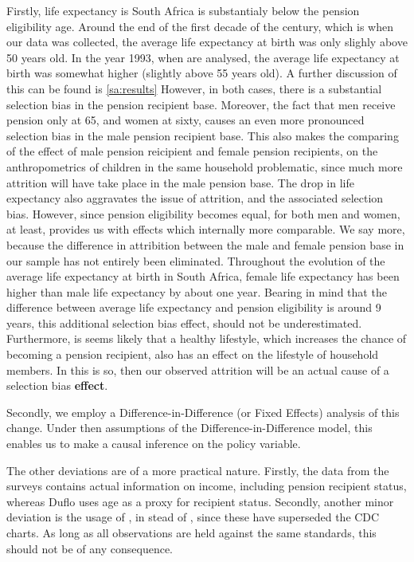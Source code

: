 \begin{refsection}
Firstly, life expectancy is South Africa is substantialy below the pension eligibility age.
Around the end of the first decade of the century, which is when our data was collected,
the average life expectancy at birth was only slighly above 50 years old.
In the year 1993, when \textcite{duflo2000child,duflo2003grandmothers} are analysed,
the average life expectancy at birth was somewhat higher (slightly above 55 years old).
A further discussion of this can be found is \autoref{sa:results}
However, in both cases, there is a substantial selection bias in the pension recipient base.
Moreover, the fact that men receive pension only at 65, and women at sixty,
causes an even more pronounced selection bias in the male pension recipient base.
This also makes the comparing of the effect of male pension reicipient and female pension recipients,
on the anthropometrics of children in the same household problematic,
since much more attrition will have take place in the male pension base.
The drop in life expectancy also aggravates the issue of attrition,
and the associated selection bias.
However, since pension eligibility becomes equal, for both men and women, at least,
provides us with effects which internally more comparable.
We say more, because the difference in attribition between the male and female pension base in our sample has not entirely been eliminated.
Throughout the evolution of the average life expectancy at birth in South Africa,
female life expectancy has been higher than male life expectancy by about one year.
Bearing in mind that the difference between average life expectancy and pension eligibility is around 9 years,
this additional selection bias effect, should not be underestimated.
Furthermore, is seems likely that a healthy lifestyle, which increases the chance of becoming a pension recipient,
also has an effect on the lifestyle of household members.
In this is so, then our observed attrition will be an actual cause of a selection bias \textbf{effect}.


Secondly, we employ a Difference-in-Difference (or Fixed Effects) analysis of this change.
Under then assumptions of the Difference-in-Difference model,
this enables us to make a causal inference on the policy variable.

The other deviations are of a more practical nature.
Firstly, the data from the \textcite{saldru2008nids,saldru2012nids,saldru2013nids} surveys contains actual information on income,
including pension recipient status, whereas Duflo uses age as a proxy for recipient status.
Secondly, another minor deviation is the usage of \textcite[WHO Child Growth Standards]{who2006child},
in stead of \textcite[CDC Growth Charts: United States]{nchs2000cdc}, since these have superseded the CDC charts.
As long as all observations are held against the same standards, this should not be of any consequence.


\end{refsection}
